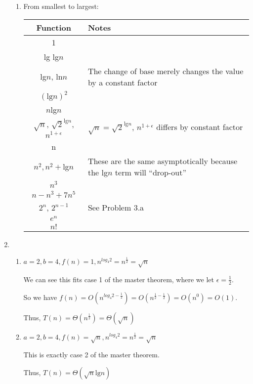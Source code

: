 \documentclass[12pt,letterpaper]{article}
\begin{document}
\begin{enumerate}
\begin{enumerate}
        \item
          From smallest to largest:

          \begin{tabular}{c | l}
            Function & Notes \\
            \hline
            1 \\
            lg lg$n$ \\
            lg$n$, ln$n$ & The change of base merely changes the value by a constant factor \\
            $(\text{lg}n)^2$ \\
            $n$lg$n$ \\
            $\sqrt{n}$, $\sqrt{2}^{\text{lg}n}$, $n^{1+\epsilon}$ & $\sqrt{n} = \sqrt{2}^{\text{lg}n}$, $n^{1+\epsilon}$ differs by  constant factor \\
            n \\
            $n^2, n^2 + $lg$n$ & These are the same asymptotically because the lg$n$ term will ``drop-out'' \\
            $n^3$ \\
            $n - n^3 + 7n^5$ \\
            $2^n$, $2^{n-1}$ & See Problem 3.a \\
            $e^n$ \\
            $n!$
          \end{tabular}
      \end{enumerate}

    \pagebreak

    \item
      \begin{enumerate}
        \item
          $a = 2, b = 4, f(n) = 1, n^{log_4 2} = n^\frac{1}{2} = \sqrt{n}$

          We can see this fits case 1 of the master theorem, where we let $\epsilon = \frac{1}{2}$.

          So we have $f(n) = O(n^{log_4 2 - \frac{1}{2}}) = O(n^{\frac{1}{2} - \frac{1}{2}}) = O(n^0) = O(1)$.

          Thus, $T(n) = \Theta(n^\frac{1}{2}) = \Theta(\sqrt{n})$
        \item
          $a = 2, b = 4, f(n) = \sqrt{n}, n^{log_4 2} = n^\frac{1}{2} = \sqrt{n}$

          This is exactly case 2 of the master theorem.

          Thus, $T(n) = \Theta(\sqrt{n}\text{lg}n)$


\end{enumerate}
\end{enumerate}
\end{document}
